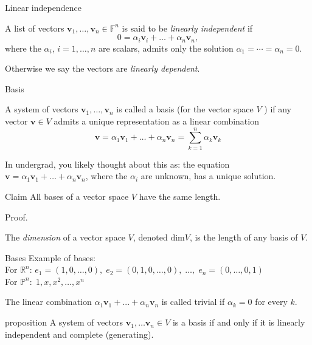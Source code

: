 \documentclass [aspectratio=169]{beamer}
\newcommand{\bv}{{\mathbf{v}}}
\newcommand{\R}{{\mathds{R}}}
\newcommand{\F}{{\mathds{F}}}
\begin{document}
\begin{frame}{Linear independence}
\begin{definition}
A list of vectors $\bv_1, \ldots, \bv_n \in \F^n$ is said to be \emph{linearly independent} if 
$$ 0 = \alpha_i \bv_i + \ldots + \alpha_n \bv_n, $$
where the $\alpha_i$, $i=1,\ldots,n$ are scalars, admits only the solution $\alpha_1 = \cdots = \alpha_n = 0$.
\end{definition}

\vspace{1em} Otherwise we say the vectors are \emph{linearly dependent}.

\end{frame}


\begin{frame}{Basis}
\begin{definition}
A system of vectors $\bv_1, \ldots, \bv_n$ is called a basis (for the vector space $V$ ) if any vector $\bv \in V$ admits a unique representation as a linear combination
$$
\bv = \alpha_1 \bv_1 + \ldots + \alpha_n \bv_n = \sum_{k=1}^n \alpha_k \bv_k
$$
\end{definition}

In undergrad, you likely thought about this as: the equation $\bv = \alpha_1 \bv_1 + \ldots + \alpha_n \bv_n$, where the $\alpha_i$ are unknown, has a unique solution.
\end{frame}

\begin{frame}


\begin{exampleblock}{Claim}
All bases of a vector space $V$ have the same length.
\end{exampleblock}

Proof.

\vspace{4cm}

\begin{definition}
The \emph{dimension} of a vector space $V$, denoted $\text{dim} V$, is the length of any basis of $V$.
\end{definition}


\end{frame}

\begin{frame}{Bases}
Example of bases: \\
For $\R^n$: $e_1 = (1,0,\ldots, 0), \; e_2 = (0,1,0,\ldots,0), \; \ldots, \; e_n = (0, \ldots, 0, 1)$ \\
For $\mathbb{P}^n: \; 1, x, x^2, \ldots, x^n$

\begin{definition}
The linear combination $\alpha_{1}\bv_{1}+...+\alpha_{n}\bv_{n}$ is called trivial if $\alpha_k = 0$ for every $k$.
\end{definition}

\begin{block}{proposition}
 A system of vectors $\bv_1, \ldots \bv_n \in V$ is a basis if and only if it is linearly independent and complete (generating).
\end{block}

\end{frame}
\end{document}
